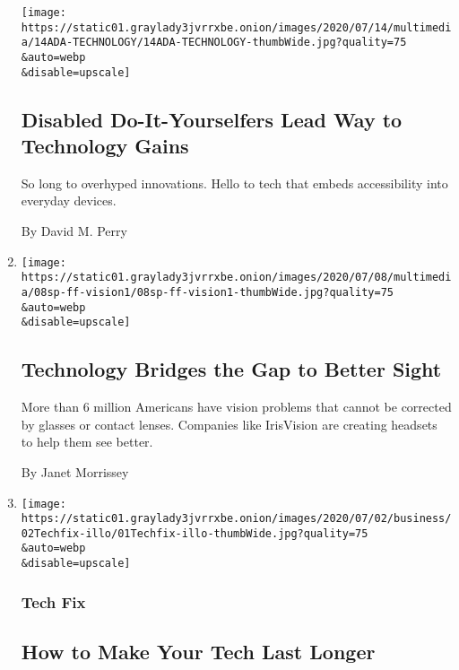 \begin{enumerate}
  \texttt{[image: https://static01.graylady3jvrrxbe.onion/images/2020/07/14/multimedia/14ADA-TECHNOLOGY/14ADA-TECHNOLOGY-thumbWide.jpg?quality=75\\\&auto=webp\\\&disable=upscale]}

  \hypertarget{disabled-do-it-yourselfers-lead-way-to-technology-gains}{%
  \subsection{Disabled Do-It-Yourselfers Lead Way to Technology
  Gains}\label{disabled-do-it-yourselfers-lead-way-to-technology-gains}}

  So long to overhyped innovations. Hello to tech that embeds
  accessibility into everyday devices.

  By David M. Perry
\item
  \href{/2020/07/07/health/vision-problems-technology-headsets.html}{}

  \texttt{[image: https://static01.graylady3jvrrxbe.onion/images/2020/07/08/multimedia/08sp-ff-vision1/08sp-ff-vision1-thumbWide.jpg?quality=75\\\&auto=webp\\\&disable=upscale]}

  \hypertarget{technology-bridges-the-gap-to-better-sight}{%
  \subsection{Technology Bridges the Gap to Better
  Sight}\label{technology-bridges-the-gap-to-better-sight}}

  More than 6 million Americans have vision problems that cannot be
  corrected by glasses or contact lenses. Companies like IrisVision are
  creating headsets to help them see better.

  By Janet Morrissey
\item
  \href{/2020/07/01/technology/personaltech/make-your-tech-last-longer.html}{}

  \texttt{[image: https://static01.graylady3jvrrxbe.onion/images/2020/07/02/business/02Techfix-illo/01Techfix-illo-thumbWide.jpg?quality=75\\\&auto=webp\\\&disable=upscale]}

  \hypertarget{tech-fix-1}{%
  \subsubsection{Tech Fix}\label{tech-fix-1}}

  \hypertarget{how-to-make-your-tech-last-longer}{%
  \subsection{How to Make Your Tech Last
  Longer}\label{how-to-make-your-tech-last-longer}}


\end{enumerate}
